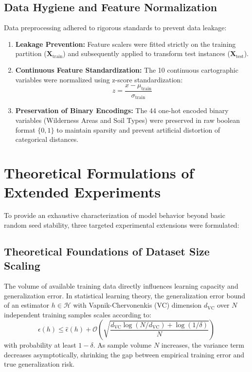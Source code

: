 \subsection{Data Hygiene and Feature Normalization}
Data preprocessing adhered to rigorous standards to prevent data leakage:
\begin{enumerate}
    \item \textbf{Leakage Prevention:} Feature scalers were fitted strictly on the training partition ($\mathbf{X}_{\text{train}}$) and subsequently applied to transform test instances ($\mathbf{X}_{\text{test}}$).
    \item \textbf{Continuous Feature Standardization:} The 10 continuous cartographic variables were normalized using z-score standardization:
    \begin{equation}
        z = \frac{x - \mu_{\text{train}}}{\sigma_{\text{train}}}
    \end{equation}
    \item \textbf{Preservation of Binary Encodings:} The 44 one-hot encoded binary variables (Wilderness Areas and Soil Types) were preserved in raw boolean format $\{0, 1\}$ to maintain sparsity and prevent artificial distortion of categorical distances.
\end{enumerate}

\section{Theoretical Formulations of Extended Experiments}
\label{sec:extended_exp_theory}

To provide an exhaustive characterization of model behavior beyond basic random seed stability, three targeted experimental extensions were formulated:

\subsection{Theoretical Foundations of Dataset Size Scaling}
\label{sec:theory_data_size}

The volume of available training data directly influences learning capacity and generalization error. In statistical learning theory, the generalization error bound of an estimator $h \in \mathcal{H}$ with Vapnik-Chervonenkis (VC) dimension $d_{\text{VC}}$ over $N$ independent training samples scales according to:
\begin{equation}
    \epsilon(h) \le \hat{\epsilon}(h) + \mathcal{O}\left( \sqrt{\frac{d_{\text{VC}} \log(N / d_{\text{VC}}) + \log(1/\delta)}{N}} \right)
\end{equation}
with probability at least $1 - \delta$. As sample volume $N$ increases, the variance term decreases asymptotically, shrinking the gap between empirical training error and true generalization risk. 

